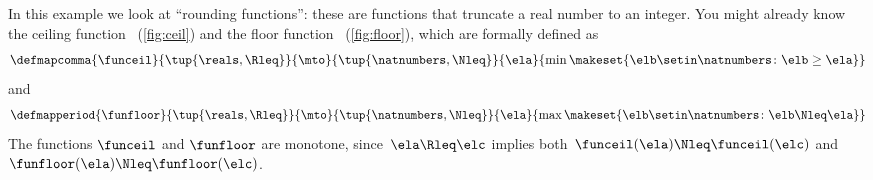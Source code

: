 \begin{example}
    \label{ex:rounding-functions}
    In this example we look at ``rounding functions'': these are functions that truncate a real number to an integer.
    You might already know the ceiling function \funceil~(\cref{fig:ceil}) and the floor function \funfloor~(\cref{fig:floor}),
    which are formally defined as
    \begin{equation}\label{eq:funceil}
        \defmapcomma{
            \funceil
        }{
            \tup{\reals,\Rleq}
        }{
            \mto
        }{
            \tup{\natnumbers,\Nleq}
        }{
            \ela
        }{
            \min \makeset{\elb \setin \natnumbers \colon \elb \geq \ela }
        }
    \end{equation}
    and
    \begin{equation}\label{eq:funfloor}
        \defmapperiod{
            \funfloor
        }{
            \tup{\reals,\Rleq}
        }{
            \mto
        }{
            \tup{\natnumbers,\Nleq}
        }{
            \ela
        }{
            \max \makeset{\elb \setin \natnumbers \colon \elb \Nleq \ela }
        }
    \end{equation}
    The functions $\funceil$ and $\funfloor$ are monotone, since~$\ela\Rleq \elc$ implies both~$\funceil(\ela)\Nleq \funceil(\elc)$ and~$\funfloor(\ela)\Nleq\funfloor(\elc)$.


\end{example}
